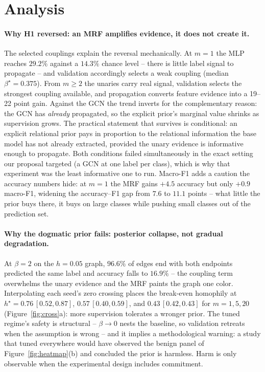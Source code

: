 \documentclass{article}
\begin{document}
\section{Analysis}
\label{sec:analysis}

\paragraph{Why H1 reversed: an MRF amplifies evidence, it does not create it.} The selected
couplings explain the reversal mechanically. At $m{=}1$ the MLP reaches $29.2\%$ against a
$14.3\%$ chance level -- there is little label signal to propagate -- and validation
accordingly selects a weak coupling (median $\beta^\star{=}0.375$). From $m{\ge}2$ the unaries
carry real signal, validation selects the strongest coupling available, and propagation
converts feature evidence into a 19--22 point gain. Against the GCN the trend inverts for the
complementary reason: the GCN has \emph{already} propagated, so the explicit prior's marginal
value shrinks as supervision grows. The practical statement that survives is conditional: an
explicit relational prior pays in proportion to the relational information the base model has
not already extracted, provided the unary evidence is informative enough to propagate. Both
conditions failed simultaneously in the exact setting our proposal targeted (a GCN at one label
per class), which is why that experiment was the least informative one to run. Macro-F1 adds a
caution the accuracy numbers hide: at $m{=}1$ the MRF gains $+4.5$ accuracy but only $+0.9$
macro-F1, widening the accuracy--F1 gap from $7.6$ to $11.1$ points -- what little the prior
buys there, it buys on large classes while pushing small classes out of the prediction set.

\paragraph{Why the dogmatic prior fails: posterior collapse, not gradual degradation.} At
$\beta{=}2$ on the $h{=}0.05$ graph, $96.6\%$ of edges end with both endpoints predicted the
same label and accuracy falls to $16.9\%$ -- the coupling term overwhelms the unary evidence
and the MRF paints the graph one color. Interpolating each seed's zero crossing places the
break-even homophily at $h^\star=0.76\,[0.52,0.87]$, $0.57\,[0.40,0.59]$, and
$0.43\,[0.42,0.43]$ for $m{=}1,5,20$ (Figure~\ref{fig:cross}a): more supervision tolerates a
wronger prior. The tuned regime's safety is structural -- $\beta\to0$ nests the baseline, so
validation retreats when the assumption is wrong -- and it implies a methodological warning: a
study that tuned everywhere would have observed the benign panel of
Figure~\ref{fig:heatmap}(b) and concluded the prior is harmless. Harm is only observable when
the experimental design includes commitment.
\end{document}
